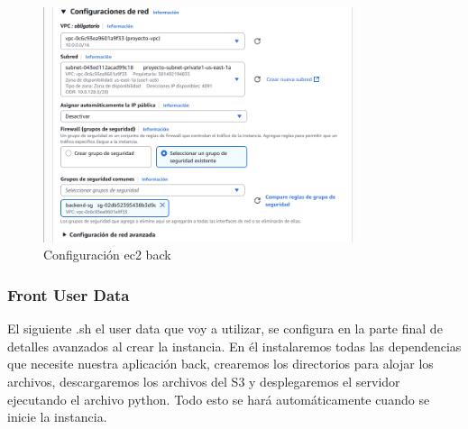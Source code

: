 \documentclass{article}
\begin{document}
			
	\begin{figure}[H]
	\centering
	\includegraphics[width=0.82\textwidth]{configuracion_ec2_back.png}
	\caption{Configuración ec2 back}
	\end{figure}

	\subsubsection{Front User Data}
	El siguiente .sh el user data que voy a utilizar, se configura en la parte final de detalles avanzados al crear la instancia. En él instalaremos todas las dependencias que necesite nuestra aplicación back, crearemos los directorios para alojar los archivos, descargaremos los archivos del S3 y desplegaremos el servidor ejecutando el archivo python. Todo esto se hará automáticamente cuando se inicie la instancia.
\end{document}
